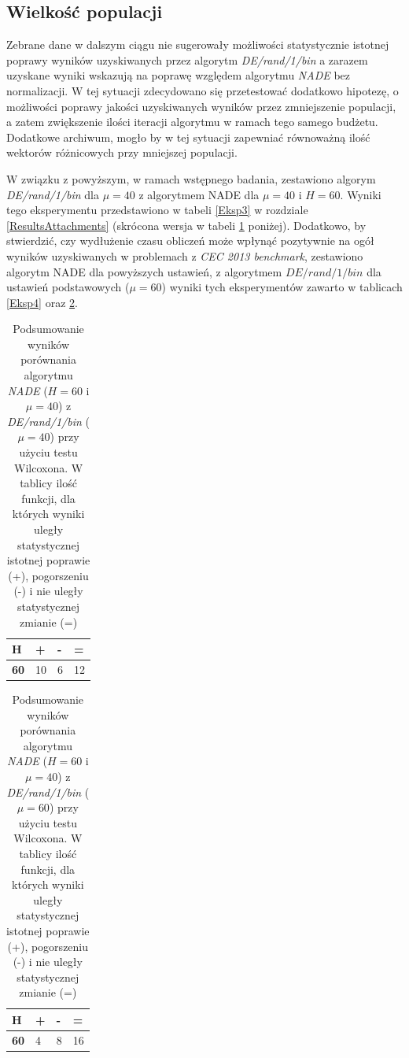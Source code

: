 \documentclass[12pt,a4paper]{report}
\begin{document}
{{{{{{\subsection{Wielkość populacji}
\par{
Zebrane dane w dalszym ciągu nie sugerowały możliwości statystycznie istotnej poprawy wyników uzyskiwanych przez algorytm \emph{DE/rand/1/bin} a zarazem uzyskane wyniki wskazują na poprawę względem algorytmu \emph{NADE} bez normalizacji. W tej sytuacji zdecydowano się przetestować dodatkowo hipotezę, o możliwości poprawy jakości uzyskiwanych wyników przez zmniejszenie populacji, a zatem zwiększenie ilości iteracji algorytmu w ramach tego samego budżetu. Dodatkowe archiwum, mogło by w tej sytuacji zapewniać równoważną ilość wektorów różnicowych przy mniejszej populacji.
}
\par{
W związku z powyższym, w ramach wstępnego badania, zestawiono algorym \emph{DE/rand/1/bin} dla $\mu = 40$ z algorytmem NADE dla $\mu = 40$ i $H = 60$. Wyniki tego eksperymentu przedstawiono w tabeli \ref{Eksp3} w rozdziale \ref{ResultsAttachments} (skrócona wersja w tabeli \ref{eks3summary} poniżej). Dodatkowo, by stwierdzić, czy wydłużenie czasu obliczeń może wpłynąć pozytywnie na ogół wyników uzyskiwanych w problemach z \emph{CEC 2013 benchmark}, zestawiono algorytm NADE dla powyższych ustawień, z algorytmem $DE/rand/1/bin$ dla ustawień podstawowych ($\mu = 60$) wyniki tych eksperymentów zawarto w tablicach \ref{Eksp4} oraz \ref{eks4summary}.
}

\begin{table}[h]
\centering
\caption{Podsumowanie wyników porównania algorytmu \emph{NADE} ($H = 60$ i $\mu = 40$) z \emph{DE/rand/1/bin} ($\mu = 40$) przy użyciu testu Wilcoxona. W tablicy ilość funkcji, dla których wyniki uległy statystycznej istotnej poprawie (+), pogorszeniu (-) i nie uległy statystycznej zmianie (=)}
\label{eks3summary}
\begin{tabular}{|l|l|l|l|}
\hline
{\bf H}  & +  & - & =  \\ \hline
{\bf 60} & 10 & 6 & 12 \\ \hline
\end{tabular}
\end{table}

\begin{table}[h]
\centering
\caption{Podsumowanie wyników porównania algorytmu \emph{NADE} ($H = 60$ i $\mu = 40$) z \emph{DE/rand/1/bin} ($\mu = 60$) przy użyciu testu Wilcoxona. W tablicy ilość funkcji, dla których wyniki uległy statystycznej istotnej poprawie (+), pogorszeniu (-) i nie uległy statystycznej zmianie (=)}
\label{eks4summary}
\begin{tabular}{|l|l|l|l|}
\hline
{\bf H}  & + & - & =  \\ \hline
{\bf 60} & 4 & 8 & 16 \\ \hline
\end{tabular}
\end{table}

}}}}}}
\end{document}
